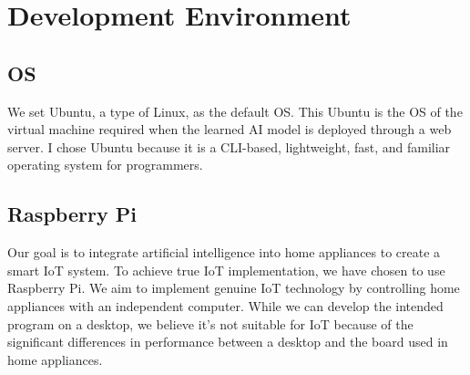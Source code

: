 \section{\textbf{Development Environment}}

\subsection{\textbf{OS}}
We set Ubuntu, a type of Linux, as the default OS. This Ubuntu is the OS of the virtual machine required when the learned AI model is deployed through a web server. I chose Ubuntu because it is a CLI-based, lightweight, fast, and familiar operating system for programmers.\\
\subsection{\textbf{Raspberry Pi}}
Our goal is to integrate artificial intelligence into home appliances to create a smart IoT system. To achieve true IoT implementation, we have chosen to use Raspberry Pi. We aim to implement genuine IoT technology by controlling home appliances with an independent computer. While we can develop the intended program on a desktop, we believe it's not suitable for IoT because of the significant differences in performance between a desktop and the board used in home appliances.\\

